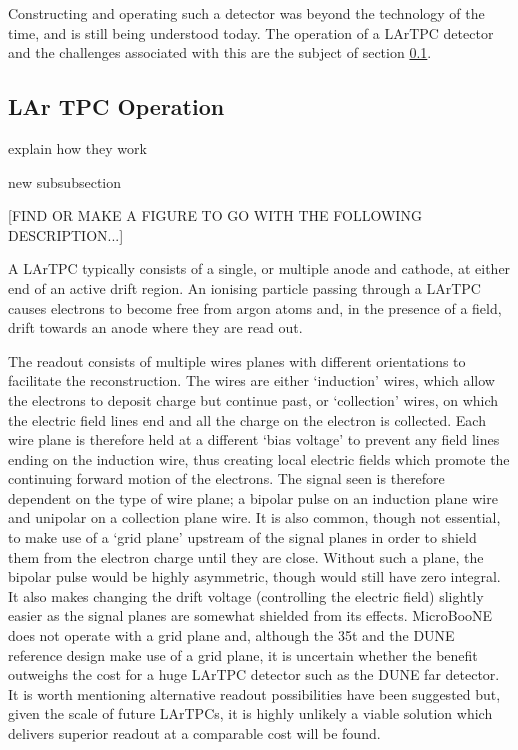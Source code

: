Constructing and operating such a detector was beyond the technology of the time, and is still being understood today.  The operation of a LArTPC detector and the challenges associated with this are the subject of section \ref{sec:LArTPCOperation}.

\subsection{LAr TPC Operation}\label{sec:LArTPCOperation}

explain how they work

new subsubsection

[FIND OR MAKE A FIGURE TO GO WITH THE FOLLOWING DESCRIPTION...]

A LArTPC typically consists of a single, or multiple anode and cathode, at either end of an active drift region.  An ionising particle passing through a LArTPC causes electrons to become free from argon atoms and, in the presence of a field, drift towards an anode where they are read out.

The readout consists of multiple wires planes with different orientations to facilitate the reconstruction.  The wires are either `induction' wires, which allow the electrons to deposit charge but continue past, or `collection' wires, on which the electric field lines end and all the charge on the electron is collected.  Each wire plane is therefore held at a different `bias voltage' to prevent any field lines ending on the induction wire, thus creating local electric fields which promote the continuing forward motion of the electrons.  The signal seen is therefore dependent on the type of wire plane; a bipolar pulse on an induction plane wire and unipolar on a collection plane wire.  It is also common, though not essential, to make use of a `grid plane' upstream of the signal planes in order to shield them from the electron charge until they are close.  Without such a plane, the bipolar pulse would be highly asymmetric, though would still have zero integral.  It also makes changing the drift voltage (controlling the electric field) slightly easier as the signal planes are somewhat shielded from its effects.  MicroBooNE does not operate with a grid plane and, although the 35t and the DUNE reference design make use of a grid plane, it is uncertain whether the benefit outweighs the cost for a huge LArTPC detector such as the DUNE far detector.  It is worth mentioning alternative readout possibilities have been suggested but, given the scale of future LArTPCs, it is highly unlikely a viable solution which delivers superior readout at a comparable cost will be found.


